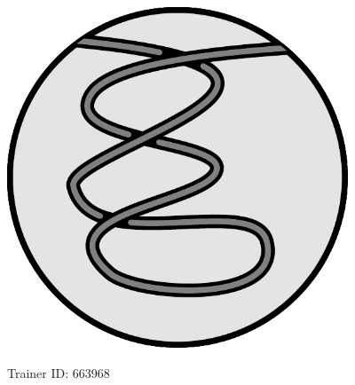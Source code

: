   \begin{center}
    \includegraphics[width=4in]{assets/unknot3.pdf}

    \Huge Trainer ID: 663968
%
  \end{center}




